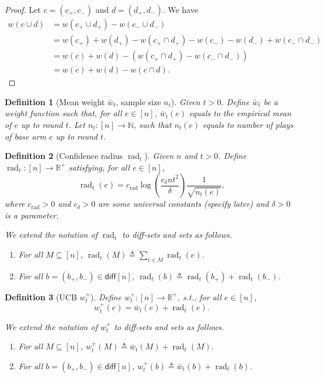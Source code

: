 \documentclass{article}
\newtheorem{define}{Definition}
\newcommand{\diff}{\mathsf{diff}}
\newcommand{\RR}{\mathbb R}
\DeclareMathOperator{\rad}{rad}
\begin{document}
\begin{spacing}{1.1}
\begin{proof}
Let $c=(c_+,c_-)$ and $d=(d_+,d_-)$.
We have
\begin{align}
w(c\cup d) &= w(c_+\cup d_+)-w(c_-\cup d_-)\\
           &= w(c_+)+w(d_+)-w(c_+\cap d_+)-w(c_-)-w(d_-)+w(c_- \cap d_-)\\
           &= w(c)+w(d)-(w(c_+\cap d_+)-w(c_-\cap d_-))\\
           &= w(c)+w(d)-w(c\cap d).
\end{align}
\end{proof}

\begin{define}[Mean weight $\bar w_t$, sample size $n_t$]
Given $t>0$. 
Define $\bar w_t$ be a weight function such that, for all $e\in[n]$, $\bar w_t(e)$ equals to the empirical mean of $e$ up to round $t$.
Let $n_t: [n] \rightarrow \mathbb N$, such that $n_t(e)$ equals to number of plays of base arm $e$ up to round $t$.
\end{define}

\begin{define}[Confidence radius $\rad_t$]
Given $n$ and $t>0$.
Define $\rad_t:[n]\rightarrow \RR^+$ satisfying, for all $e\in[n]$,
$$
\rad_t(e) = c_{\rad}\log\left(\frac{c_\delta nt^2}\delta\right)\frac{1}{\sqrt{n_t(e)}},
$$
where $c_{\rad} > 0$  and $c_\delta>0$ are some universal constants (specify later) and $\delta > 0$ is a parameter.

We extend the notation of $\rad_t$ to diff-sets and sets as follows.
\begin{enumerate}
\item For all $M \subseteq [n]$, $\rad_t(M) \triangleq \sum_{e\in M} \rad_t(e)$.
\item For all $b=(b_+,b_-)\in \diff[n]$, $\rad_t(b) \triangleq \rad_t(b_+)+\rad_t(b_-)$.
\end{enumerate}

\end{define}

\begin{define}[UCB $w_t^+$]
Define $w^+_t: [n] \rightarrow \RR^+$, s.t., for all $e\in[n]$,  
$$ w^+_t(e)=\bar w_t(e)+\rad_t(e).$$

We extend the notation of $w_t^+$ to diff-sets and sets as follows.
\begin{enumerate}
\item For all $M \subseteq [n]$, $w_t^+(M) \triangleq \bar w_t(M)+\rad_t(M)$.
\item For all $b=(b_+,b_-)\in \diff[n]$, $w_t^+(b) \triangleq \bar w_t(b)+\rad_t(b)$.
\end{enumerate}


\end{define}
\end{spacing}
\end{document}
